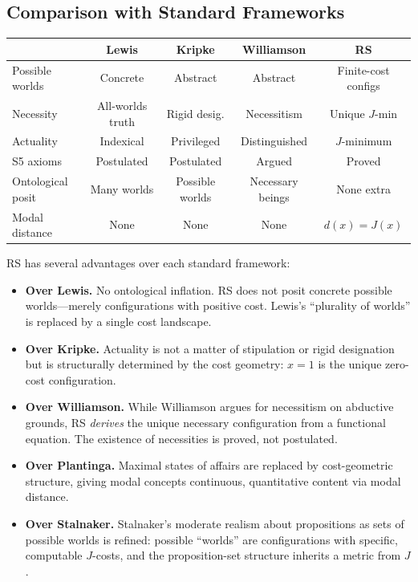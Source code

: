 \documentclass[12pt,a4paper]{article}
\theoremstyle{definition}
\theoremstyle{remark}
\begin{document}
\subsection{Comparison with Standard Frameworks}

\begin{center}
\renewcommand{\arraystretch}{1.3}
\begin{tabular}{@{}lcccc@{}}
\toprule
& \textbf{Lewis} & \textbf{Kripke} & \textbf{Williamson} & \textbf{RS} \\
\midrule
Possible worlds & Concrete & Abstract & Abstract & Finite-cost configs \\
Necessity & All-worlds truth & Rigid desig. & Necessitism & Unique $J$-min \\
Actuality & Indexical & Privileged & Distinguished & $J$-minimum \\
S5 axioms & Postulated & Postulated & Argued & Proved \\
Ontological posit & Many worlds & Possible worlds & Necessary beings & None extra \\
Modal distance & None & None & None & $d(x) = J(x)$ \\
\bottomrule
\end{tabular}
\end{center}

RS has several advantages over each standard framework:
\begin{itemize}
  \item \textbf{Over Lewis.}  No ontological inflation.  RS does not
  posit concrete possible worlds---merely configurations with positive
  cost.  Lewis's ``plurality of worlds'' is replaced by a single cost
  landscape.
  \item \textbf{Over Kripke.}  Actuality is not a matter of stipulation
  or rigid designation but is structurally determined by the cost
  geometry: $x = 1$ is the unique zero-cost configuration.
  \item \textbf{Over Williamson.}  While Williamson argues for
  necessitism on abductive grounds, RS \emph{derives} the unique
  necessary configuration from a functional equation.  The existence of
  necessities is proved, not postulated.
  \item \textbf{Over Plantinga.}  Maximal states of affairs are replaced
  by cost-geometric structure, giving modal concepts continuous,
  quantitative content via modal distance.
  \item \textbf{Over Stalnaker.}  Stalnaker's moderate realism about
  propositions as sets of possible worlds is refined: possible
  ``worlds'' are configurations with specific, computable $J$-costs, and
  the proposition-set structure inherits a metric from $J$.
\end{itemize}
\end{document}
